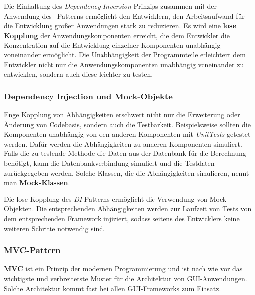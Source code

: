 Die Einhaltung des \textit{Dependency Inversion} Prinzips zusammen mit der Anwendung des \di\ Patterns ermöglicht den Entwicklern, den Arbeitsaufwand für die Entwicklung großer Anwendungen stark zu reduzieren.
Es wird eine \textbf{lose Kopplung} der Anwendungskomponenten erreicht, die dem Entwickler die Konzentration auf die Entwicklung einzelner Komponenten unabhängig voneinander ermöglicht. Die Unabhängigkeit der Programmteile erleichtert dem Entwickler nicht nur die Anwendungskomponenten unabhängig voneinander zu entwicklen, sondern auch diese leichter zu testen. 

\subsubsection{Dependency Injection und Mock-Objekte}

Enge Kopplung von Abhängigkeiten erschwert nicht nur die Erweiterung oder Änderung von Codebasis, sondern auch die Testbarkeit. Beispielsweise sollten die Komponenten unabhängig von den anderen Komponenten mit \textit{UnitTests} getestet werden. Dafür werden die Abhängigkeiten zu anderen Komponenten simuliert. Falls die zu testende Methode die Daten aus der Datenbank für die Berechnung benötigt, kann die Datenbankverbindung simuliert und die Testdaten zurückgegeben werden. Solche Klassen, die die Abhängigkeiten simulieren, nennt man \textbf{Mock-Klassen}.

Die lose Kopplung des \textit{DI} Patterns ermöglicht die Verwendung von Mock-Objekten. Die entsprechenden Abhängigkeiten werden zur Laufzeit von Tests von dem entsprechenden Framework injiziert, sodass seitens des Entwicklers keine weiteren Schritte notwendig sind.

\subsubsection{MVC-Pattern}\label{mvc}

\textbf{MVC}\cite{mvc} ist ein Prinzip der modernen Programmierung und ist nach wie vor das wichtigste und verbreitetste Muster für die Architektur von GUI-Anwendungen. Solche Architektur kommt fast bei allen GUI-Frameworks zum Einsatz.

